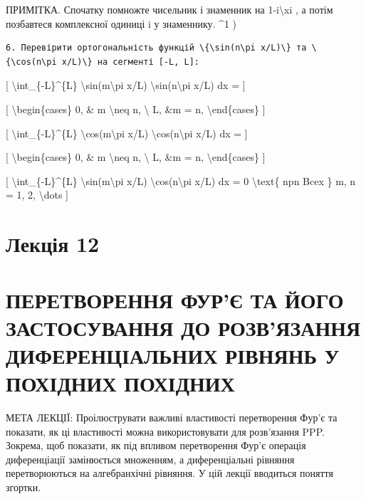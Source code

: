 \documentclass[
]{article}
\begin{document}
{{ПРИМІТКА. Спочатку помножте чисельник і знаменник на
1-i\textbackslash xi , а потім позбавтеся комплексної одиниці i у
знаменнику. \^{}1 )

\begin{verbatim}
6. Перевірити ортогональність функцій \{\sin(n\pi x/L)\} та \{\cos(n\pi x/L)\} на сегменті [-L, L]:
\end{verbatim}

{[} \textbackslash int\_\{-L\}\^{}\{L\}
\textbackslash sin(m\textbackslash pi x/L)
\textbackslash sin(n\textbackslash pi x/L) dx = {]}

{[} \textbackslash begin\{cases\} 0, \& m \textbackslash neq n,
\textbackslash{} L, \&m = n, \textbackslash end\{cases\} {]}

{[} \textbackslash int\_\{-L\}\^{}\{L\}
\textbackslash cos(m\textbackslash pi x/L)
\textbackslash cos(n\textbackslash pi x/L) dx = {]}

{[} \textbackslash begin\{cases\} 0, \& m \textbackslash neq n,
\textbackslash{} L, \&m = n, \textbackslash end\{cases\} {]}

{[} \textbackslash int\_\{-L\}\^{}\{L\}
\textbackslash sin(m\textbackslash pi x/L)
\textbackslash cos(n\textbackslash pi x/L) dx = 0 \textbackslash text\{
npn Bcex \} m, n = 1, 2, \textbackslash dots {]}

\section{Лекція 12}\label{ux43bux435ux43aux446ux456ux44f-12}

\section{ПЕРЕТВОРЕННЯ ФУР'Є ТА ЙОГО ЗАСТОСУВАННЯ ДО РОЗВ'ЯЗАННЯ
ДИФЕРЕНЦІАЛЬНИХ РІВНЯНЬ У ПОХІДНИХ
ПОХІДНИХ}\label{ux43fux435ux440ux435ux442ux432ux43eux440ux435ux43dux43dux44f-ux444ux443ux440ux454-ux442ux430-ux439ux43eux433ux43e-ux437ux430ux441ux442ux43eux441ux443ux432ux430ux43dux43dux44f-ux434ux43e-ux440ux43eux437ux432ux44fux437ux430ux43dux43dux44f-ux434ux438ux444ux435ux440ux435ux43dux446ux456ux430ux43bux44cux43dux438ux445-ux440ux456ux432ux43dux44fux43dux44c-ux443-ux43fux43eux445ux456ux434ux43dux438ux445-ux43fux43eux445ux456ux434ux43dux438ux445}

МЕТА ЛЕКЦІЇ: Проілюструвати важливі властивості перетворення Фур'є та
показати, як ці властивості можна використовувати для розв'язання PPP.
Зокрема, щоб показати, як під впливом перетворення Фур'є операція
диференціації замінюється множенням, а диференціальні рівняння
перетворюються на алгебранхічні рівняння. У цій лекції вводиться поняття
згортки.

}}
\end{document}
